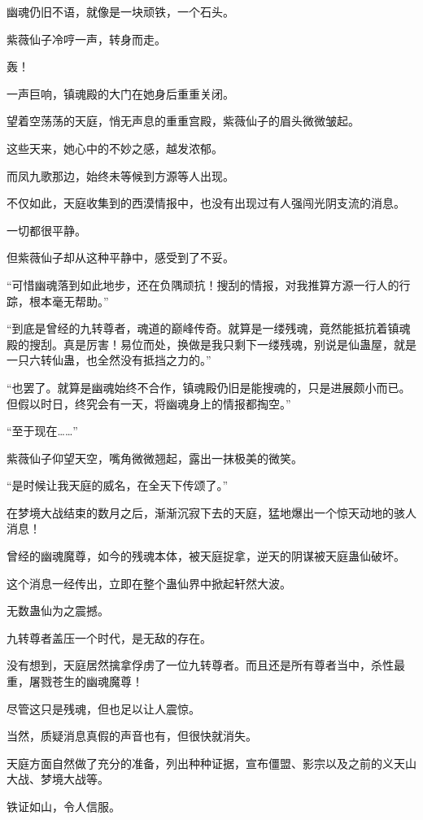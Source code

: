 \begin{this_body}
幽魂仍旧不语，就像是一块顽铁，一个石头。

紫薇仙子冷哼一声，转身而走。

轰！

一声巨响，镇魂殿的大门在她身后重重关闭。

望着空荡荡的天庭，悄无声息的重重宫殿，紫薇仙子的眉头微微皱起。

这些天来，她心中的不妙之感，越发浓郁。

而凤九歌那边，始终未等候到方源等人出现。

不仅如此，天庭收集到的西漠情报中，也没有出现过有人强闯光阴支流的消息。

一切都很平静。

但紫薇仙子却从这种平静中，感受到了不妥。

“可惜幽魂落到如此地步，还在负隅顽抗！搜刮的情报，对我推算方源一行人的行踪，根本毫无帮助。”

“到底是曾经的九转尊者，魂道的巅峰传奇。就算是一缕残魂，竟然能抵抗着镇魂殿的搜刮。真是厉害！易位而处，换做是我只剩下一缕残魂，别说是仙蛊屋，就是一只六转仙蛊，也全然没有抵挡之力的。”

“也罢了。就算是幽魂始终不合作，镇魂殿仍旧是能搜魂的，只是进展颇小而已。但假以时日，终究会有一天，将幽魂身上的情报都掏空。”

“至于现在……”

紫薇仙子仰望天空，嘴角微微翘起，露出一抹极美的微笑。

“是时候让我天庭的威名，在全天下传颂了。”

在梦境大战结束的数月之后，渐渐沉寂下去的天庭，猛地爆出一个惊天动地的骇人消息！

曾经的幽魂魔尊，如今的残魂本体，被天庭捉拿，逆天的阴谋被天庭蛊仙破坏。

这个消息一经传出，立即在整个蛊仙界中掀起轩然大波。

无数蛊仙为之震撼。

九转尊者盖压一个时代，是无敌的存在。

没有想到，天庭居然擒拿俘虏了一位九转尊者。而且还是所有尊者当中，杀性最重，屠戮苍生的幽魂魔尊！

尽管这只是残魂，但也足以让人震惊。

当然，质疑消息真假的声音也有，但很快就消失。

天庭方面自然做了充分的准备，列出种种证据，宣布僵盟、影宗以及之前的义天山大战、梦境大战等。

铁证如山，令人信服。


\end{this_body}

